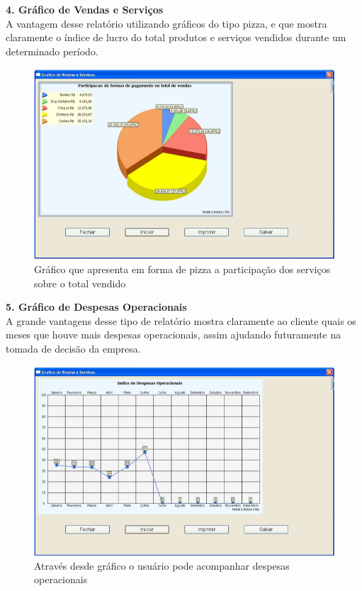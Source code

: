 \documentclass[12pt,openright,twoside,a4paper,english,french,spanish,brazil]{abntex2}
\begin{document}
\textbf{4.	{Gráfico de Vendas e Serviços}}\\
A vantagem desse relatório utilizando gráficos do tipo pizza, e que mostra claramente o índice de lucro do total produtos e serviços vendidos durante um determinado período.

\begin{figure}[htb!]
\includegraphics[scale=0.6]{grafico_vendas_servico} 
\centering
\caption{Gráfico que apresenta em forma de pizza a participação dos serviços sobre o total vendido}
\label{img_grafico_vendas_servico}
\end{figure}

\newpage

\textbf{5.	{Gráfico de Despesas Operacionais}}\\
A grande vantagens desse tipo de relatório mostra claramente ao cliente quais os meses que houve mais despesas operacionais, assim ajudando futuramente na tomada de decisão da empresa.

\begin{figure}[htb!]
\includegraphics[scale=0.7]{grafico_despesa_operacional} 
\centering
\caption{Através desde gráfico o usuário pode acompanhar despesas operacionais}
\label{img_grafico_despesa_operacional}
\end{figure}
\end{document}
